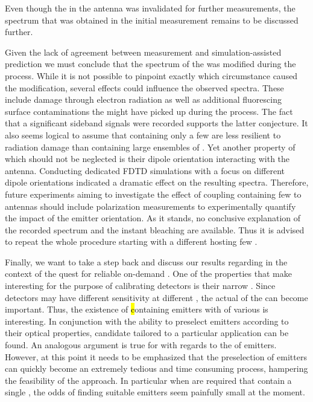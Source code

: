   Even though the \nd in the antenna was invalidated for further measurements, the spectrum that was obtained in the initial measurement remains to be discussed further.

   Given the lack of agreement between measurement and simulation-assisted prediction we must conclude that the spectrum of the \nd was modified during the \pp process. While it is not possible to pinpoint exactly which circumstance caused the modification, several effects could influence the observed spectra. These include damage through electron radiation as well as additional fluorescing surface contaminations the \nd might have picked up during the \pp process. The fact that a significant sideband signals were recorded supports the latter conjecture. It also seems logical to assume that \nds containing only a few \sivs are less resilient to radiation damage than \nds containing large ensembles of \sivs.
   Yet another property of \sivs which should not be neglected is their dipole orientation interacting with the antenna. Conducting dedicated FDTD simulations with a focus on different dipole orientations indicated a dramatic effect on the resulting spectra. Therefore, future experiments aiming to investigate the effect of coupling \nds containing few \sivs to antennas should include polarization measurements to experimentally quantify the impact of the emitter orientation. As it stands, no conclusive explanation of the recorded spectrum and the instant bleaching are available. Thus it is advised to repeat the whole procedure starting with a different \nd hosting few \sivs.


   Finally, we want to take a step back and discuss our results regarding \sivs in the context of the quest for reliable on-demand \sps. One of the properties that make \sivs interesting \spss for the purpose of calibrating detectors is their narrow \lw \zpl. Since detectors may have different sensitivity at different \wl, the actual \wl of the \zpl can become important. Thus, the existence of \hl containing emitters with \zpls of various \wls is interesting.
   In conjunction with the ability to preselect emitters according to their optical properties, candidate \nds tailored to a particular application can be found. An analogous argument is true for \vl with regards to the \cwl of emitters. However, at this point it needs to be emphasized that the preselection of emitters can quickly become an extremely tedious and time consuming process, hampering the feasibility of the approach. In particular when \nds are required that contain a single \siv, the odds of finding suitable emitters seem painfully small at the moment.


